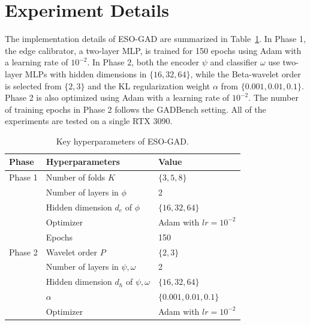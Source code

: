 \section{Experiment Details}\label{app:details}

The implementation details of ESO-GAD are summarized in Table~\ref{tab:hyperparameters}.
In Phase 1, the edge calibrator, a two-layer MLP, is trained for 150 epochs using Adam with a learning rate of $10^{-2}$.
In Phase 2, both the encoder $\psi$ and classifier $\omega$ use two-layer MLPs with hidden dimensions in $\{16,32,64\}$, while the Beta-wavelet order is selected from $\{2,3\}$ and the KL regularization weight $\alpha$ from $\{0.001,0.01,0.1\}$. Phase 2 is also optimized using Adam with a learning rate of $10^{-2}$.
The number of training epochs in Phase 2 follows the GADBench setting.
All of the experiments are tested on a single RTX 3090.

\begin{table}[h]
\centering
\small
\caption{Key hyperparameters of ESO-GAD.}
\label{tab:hyperparameters}
\begin{tabular}{@{}p{1.0cm}p{3.5cm}p{2.8cm}@{}}
\hline
Phase & Hyperparameters & Value \\
\hline
Phase 1
        & Number of folds $K$  & $\{3,5,8\}$ \\
        & Number of layers in $\phi$ & 2 \\
        & Hidden dimension $d_e$ of $\phi$& $\{16,32,64\}$ \\
        & Optimizer & Adam with $lr=10^{-2}$ \\
        & Epochs & 150 \\
\hline
Phase 2 & Wavelet order $P$ & $\{2,3\}$ \\
        & Number of layers in $\psi, \omega$ & 2 \\
        & Hidden dimension $d_h$ of $\psi, \omega$& $\{16,32,64\}$ \\
        & $\alpha$ & $\{0.001,0.01,0.1\}$ \\
        & Optimizer & Adam with $lr=10^{-2}$ \\
\hline
\end{tabular}
\vspace{2pt}
\end{table}

